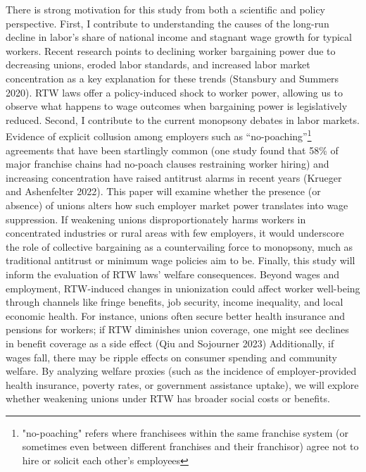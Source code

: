 There is strong motivation for this study from both a scientific and policy perspective. 
First, I contribute to understanding the causes of the long-run decline in labor’s share of national income and stagnant wage growth for typical workers.
Recent research points to declining worker bargaining power due to decreasing unions, eroded labor standards, and increased labor market concentration as a key explanation for these trends (Stansbury and Summers 2020).
RTW laws offer a policy-induced shock to worker power, allowing us to observe what happens to wage outcomes when bargaining power is legislatively reduced.
Second, I contribute to the current monopsony debates in labor markets.
Evidence of explicit collusion among employers such as “no-poaching”\footnote{"no-poaching" refers where franchisees within the same franchise system (or sometimes even between different franchises and their franchisor) agree not to hire or solicit each other's employees} agreements that have been startlingly common (one study found that 58\% of major franchise chains had no-poach clauses restraining worker hiring) and increasing concentration have raised antitrust alarms in recent years (Krueger and Ashenfelter 2022). 
This paper will examine whether the presence (or absence) of unions alters how such employer market power translates into wage suppression.
If weakening unions disproportionately harms workers in concentrated industries or rural areas with few employers, it would underscore the role of collective bargaining as a countervailing force to monopsony, much as traditional antitrust or minimum wage policies aim to be.
Finally, this study will inform the evaluation of RTW laws’ welfare consequences. 
Beyond wages and employment, RTW-induced changes in unionization could affect worker well-being through channels like fringe benefits, job security, income inequality, and local economic health.
For instance, unions often secure better health insurance and pensions for workers; if RTW diminishes union coverage, one might see declines in benefit coverage as a side effect (Qiu and Sojourner 2023)
Additionally, if wages fall, there may be ripple effects on consumer spending and community welfare.
By analyzing welfare proxies (such as the incidence of employer-provided health insurance, poverty rates, or government assistance uptake), we will explore whether weakening unions under RTW has broader social costs or benefits.


